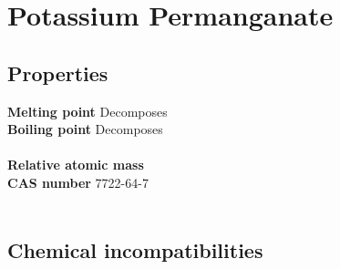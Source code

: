 \section{Potassium Permanganate}
\label{sec:chem-7722-64-7}
\subsection{Properties}
\textbf{Melting point} Decomposes\\
\textbf{Boiling point} Decomposes\\
\\
\textbf{Relative atomic mass} \\
\textbf{CAS number} 7722-64-7\\
\\
\subsection{Chemical incompatibilities}